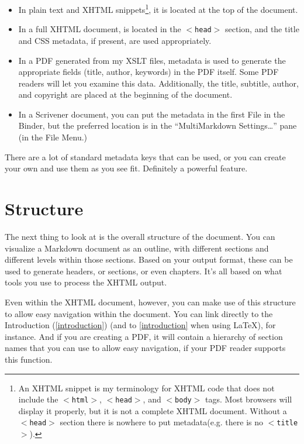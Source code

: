 \begin{itemize}
\item In plain text and XHTML snippets\footnote{An XHTML snippet is my terminology for XHTML code that does not
include the \texttt{$<$html$>$}, \texttt{$<$head$>$}, and \texttt{$<$body$>$} tags. Most browsers will display
it properly, but it is not a complete XHTML document. Without a \texttt{$<$head$>$}
section there is nowhere to put metadata(e.g. there is no \texttt{$<$title$>$}).}, it is located at the top of the
 document.

\item In a full XHTML document, is located in the \texttt{$<$head$>$} section, and the title
 and CSS metadata, if present, are used appropriately.

\item In a PDF generated from my XSLT files, metadata is used to generate the
 appropriate fields (title, author, keywords) in the PDF itself. Some PDF
 readers will let you examine this data. Additionally, the title, subtitle,
 author, and copyright are placed at the beginning of the document.

\item In a Scrivener document, you can put the metadata in the first File in the
 Binder, but the preferred location is in the ``MultiMarkdown Settings{\ldots}''
 pane (in the File Menu.)

\end{itemize}

There are a lot of standard metadata keys that can be used, or you can create
your own and use them as you see fit. Definitely a powerful feature.

\section{Structure}
\label{structure}

The next thing to look at is the overall structure of the document. You can
visualize a Markdown document as an outline, with different sections and
different levels within those sections. Based on your output format, these can
be used to generate headers, or sections, or even chapters. It's all based on
what tools you use to process the XHTML output.

Even within the XHTML document, however, you can make use of this structure to
allow easy navigation within the document. You can link directly to the
Introduction (\autoref{introduction}) (and to \autoref{introduction} when using LaTeX), for instance. And
if you are creating a PDF, it will contain a hierarchy of section names that
you can use to allow easy navigation, if your PDF reader supports this
function.

